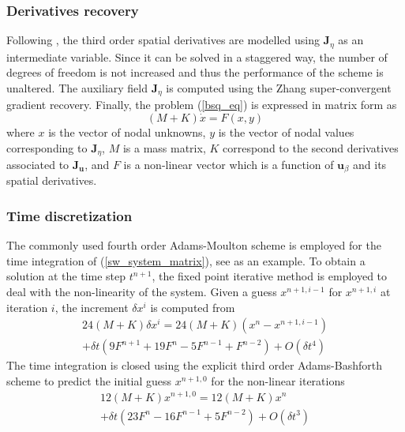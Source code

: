 \subsubsection{Derivatives recovery}

Following \cite{walkley2002}, the third order spatial derivatives are modelled using $\mathbf{J}_\eta$ as an intermediate variable. Since it can be solved in a staggered way, the number of degrees of freedom is not increased and thus the performance of the scheme is unaltered. The auxiliary field $\mathbf{J}_\eta$ is computed using the Zhang \cite{zhang2005} super-convergent gradient recovery.
Finally, the problem (\ref{bsq_eq}) is expressed in matrix form as
\begin{equation} \label{sw_system_matrix}
    (M + K) \dot{x} = F(x,y)
\end{equation} 
where $x$ is the vector of nodal unknowns, $y$ is the vector of nodal values corresponding to $\mathbf{J}_\eta$, $M$ is a mass matrix, $K$ correspond to the second derivatives associated to $\mathbf{J}_{\mathbf{u}}$, and $F$ is a non-linear vector which is a function of $\mathbf{u}_\beta$ and its spatial derivatives.


\subsubsection{Time discretization}

The commonly used fourth order Adams-Moulton scheme is employed for the time integration of (\ref{sw_system_matrix}), see \cite{wei1995,woo2004a,codina2008b} as an example.
To obtain a solution at the time step $t^{n+1}$, the fixed point iterative method is employed to deal with the non-linearity of the system. Given a guess $x^{n+1,i-1}$ for $x^{n+1,i}$ at iteration $i$, the increment $\delta x^i$ is computed from
\begin{multline}
    24 (M + K) \delta x^i = 
    24 (M + K) (x^n - x^{n+1,i-1}) \\
     + \delta t (9F^{n+1} + 19F^n - 5F^{n-1} + F^{n-2}) + O(\delta t^4)
    \label{adams-moulton}
\end{multline}
The time integration is closed using the explicit third order Adams-Bashforth scheme to predict the initial guess $x^{n+1,0}$ for the non-linear iterations
\begin{multline}
    12 (M + K) x^{n+1,0} = 
    12 (M + K) x^n \\
     + \delta t (23F^n - 16F^{n-1} + 5F^{n-2}) + O(\delta t^3)
    \label{adams-bashforth}
\end{multline}

